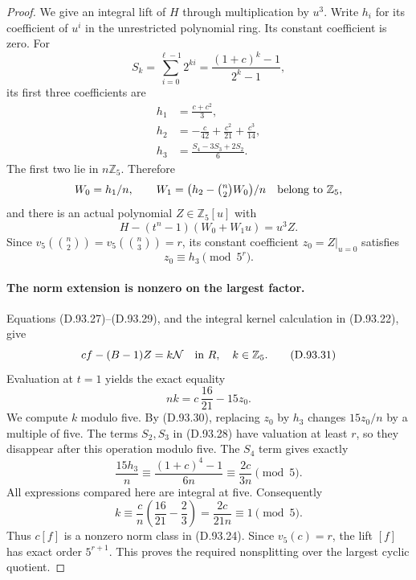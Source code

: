 \begin{proof}
We give an integral lift of \(H\) through multiplication
by \(u^3\). Write \(h_i\) for its coefficient of \(u^i\)
in the unrestricted polynomial ring. Its constant
coefficient is zero. For
\[
        S_k=\sum_{i=0}^{\ell-1}2^{ki}
               =\frac{(1+c)^k-1}{2^k-1},
\]
its first three coefficients are
\[
 \begin{aligned}
 h_1&=\frac{c+c^2}{3},\\
 h_2&=-\frac c{42}+\frac{c^2}{21}+\frac{c^3}{14},\\
 h_3&=\frac{S_4-3S_3+2S_2}{6}.
 \end{aligned}                                       \tag{D.93.28}
\]
The first two lie in \(n\mathbb Z_5\). Therefore
\[
 W_0=h_1/n,\qquad
 W_1=\bigl(h_2-\tbinom n2W_0\bigr)/n
                       \quad\hbox{belong to }\mathbb Z_5,
\]
and there is an actual polynomial \(Z\in\mathbb Z_5[u]\)
with
\[
 H-(t^n-1)(W_0+W_1u)=u^3Z.                            \tag{D.93.29}
\]
Since \(v_5(\binom n2)=v_5(\binom n3)=r\), its
constant coefficient \(z_0=Z|_{u=0}\) satisfies
\[
                         z_0\equiv h_3\pmod{5^r}.      \tag{D.93.30}
\]

\paragraph{The norm extension is nonzero on the largest factor.}
Equations (D.93.27)--(D.93.29), and the integral kernel
calculation in (D.93.22), give
\[
             c f-(B-1)Z=k\mathcal N
                   \quad\hbox{in }R,\quad k\in\mathbb Z_5.
                                                               \tag{D.93.31}
\]
Evaluation at \(t=1\) yields the exact equality
\[
                 nk=c\,\frac{16}{21}-15z_0.            \tag{D.93.32}
\]
We compute \(k\) modulo five. By (D.93.30), replacing
\(z_0\) by \(h_3\) changes \(15z_0/n\) by a multiple
of five. The terms \(S_2,S_3\) in (D.93.28) have
valuation at least \(r\), so they disappear after this
operation modulo five. The \(S_4\) term gives exactly
\[
 \frac{15h_3}{n}
   \equiv\frac{(1+c)^4-1}{6n}
   \equiv\frac{2c}{3n}\pmod5.
\]
All expressions compared here are integral at five.
Consequently
\[
       k\equiv\frac cn\left(\frac{16}{21}-\frac23\right)
        =\frac{2c}{21n}\equiv1\pmod5.                 \tag{D.93.33}
\]
Thus \(c[f]\) is a nonzero norm class in (D.93.24).
Since \(v_5(c)=r\), the lift \([f]\) has exact order
\(5^{r+1}\). This proves the required nonsplitting over
the largest cyclic quotient.


\end{proof}
